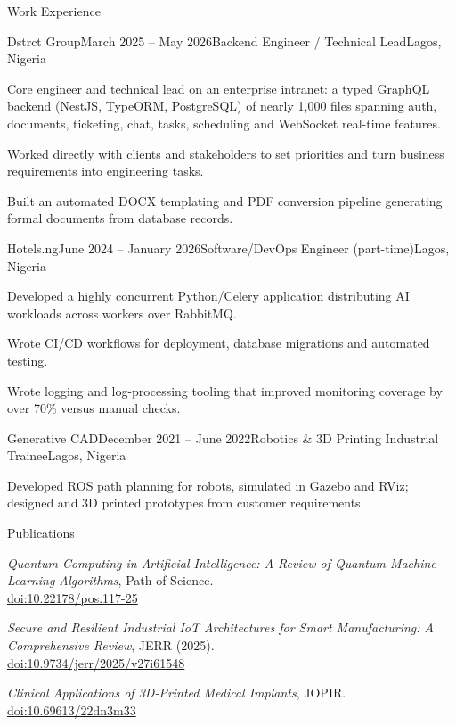 \documentclass{resume}
\begin{document}
\begin{rSection}{Work Experience}

\begin{rSubsection}{Dstrct Group}{March 2025 -- May 2026}{Backend Engineer / Technical Lead}{Lagos, Nigeria}
\item Core engineer and technical lead on an enterprise intranet: a typed GraphQL backend (NestJS, TypeORM, PostgreSQL) of nearly 1,000 files spanning auth, documents, ticketing, chat, tasks, scheduling and WebSocket real-time features.
\item Worked directly with clients and stakeholders to set priorities and turn business requirements into engineering tasks.
\item Built an automated DOCX templating and PDF conversion pipeline generating formal documents from database records.
\end{rSubsection}

\begin{rSubsection}{Hotels.ng}{June 2024 -- January 2026}{Software/DevOps Engineer (part-time)}{Lagos, Nigeria}
\item Developed a highly concurrent Python/Celery application distributing AI workloads across workers over RabbitMQ.
\item Wrote CI/CD workflows for deployment, database migrations and automated testing.
\item Wrote logging and log-processing tooling that improved monitoring coverage by over 70\% versus manual checks.
\end{rSubsection}

\begin{rSubsection}{Generative CAD}{December 2021 -- June 2022}{Robotics \& 3D Printing Industrial Trainee}{Lagos, Nigeria}
\item Developed ROS path planning for robots, simulated in Gazebo and RViz; designed and 3D printed prototypes from customer requirements.
\end{rSubsection}

\end{rSection}

\begin{rSection}{Publications}
\item \textit{Quantum Computing in Artificial Intelligence: A Review of Quantum Machine Learning Algorithms}, Path of Science.\\ \href{http://dx.doi.org/10.22178/pos.117-25}{doi:10.22178/pos.117-25}
\item \textit{Secure and Resilient Industrial IoT Architectures for Smart Manufacturing: A Comprehensive Review}, JERR (2025).\\ \href{https://doi.org/10.9734/jerr/2025/v27i61548}{doi:10.9734/jerr/2025/v27i61548}
\item \textit{Clinical Applications of 3D-Printed Medical Implants}, JOPIR.\\ \href{https://doi.org/10.69613/22dn3m33}{doi:10.69613/22dn3m33}
\end{rSection}
\end{document}
